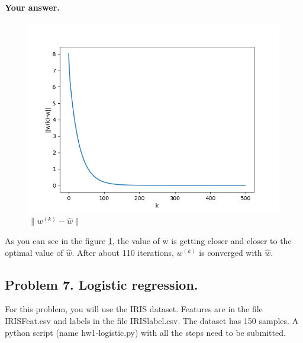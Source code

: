 \documentclass[11pt]{scrartcl}
\begin{document}
	\paragraph{Your answer.}
	\begin{figure}
		\includegraphics[width=\linewidth]{iterative.png}
		\caption{$\|w^{(k)}-\hat{w}\|$}
		\label{lsq}
	\end{figure}
	As you can see in the figure \ref{lsq}, the value of w is getting closer and closer to the optimal value of $\hat{w}$. After about 110 iterations, $w^{(k)}$ is converged with $\hat{w}$.
	
	
	
	\subsection*{Problem 7. Logistic regression.}
	
	For this problem, you will use the IRIS dataset. Features are in the file IRISFeat.csv and labels in the file IRISlabel.csv. The dataset has 150 samples.
	A python script (name hw1-logistic.py) with all the steps need to be submitted. 
	
\end{document}
